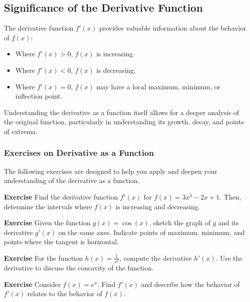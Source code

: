 \documentclass[a4paper,12pt]{book}
\newenvironment{exercise}[1][]
  {\par\medskip\noindent\textbf{Exercise #1} \rmfamily}
  {\medskip}
\begin{document}
\subsection{Significance of the Derivative Function}
The derivative function \( f'(x) \) provides valuable information about the behavior of \( f(x) \):

\begin{itemize}
    \item Where \( f'(x) > 0 \), \( f(x) \) is increasing.
    \item Where \( f'(x) < 0 \), \( f(x) \) is decreasing.
    \item Where \( f'(x) = 0 \), \( f(x) \) may have a local maximum, minimum, or inflection point.
\end{itemize}

Understanding the derivative as a function itself allows for a deeper analysis of the original function, particularly in understanding its growth, decay, and points of extrema.

\subsubsection*{Exercises on Derivative as a Function}

The following exercises are designed to help you apply and deepen your understanding of the derivative as a function.

\begin{exercise}
Find the derivative function \( f'(x) \) for \( f(x) = 3x^3 - 2x + 1 \). Then, determine the intervals where \( f(x) \) is increasing and decreasing.
\end{exercise}

\begin{exercise}
Given the function \( g(x) = \cos(x) \), sketch the graph of \( g \) and its derivative \( g'(x) \) on the same axes. Indicate points of maximum, minimum, and points where the tangent is horizontal.
\end{exercise}

\begin{exercise}
For the function \( h(x) = \frac{1}{x^2} \), compute the derivative \( h'(x) \). Use the derivative to discuss the concavity of the function.
\end{exercise}

\begin{exercise}
Consider \( f(x) = e^x \). Find \( f'(x) \) and describe how the behavior of \( f'(x) \) relates to the behavior of \( f(x) \).
\end{exercise}
\end{document}

